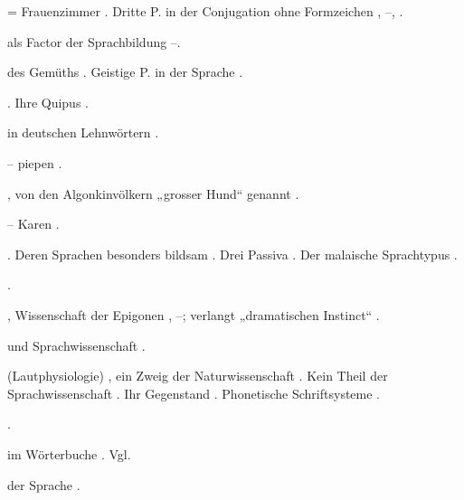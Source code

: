 \begin{register}

 = Frauenzimmer \pageref{sp.235}. Dritte P. in der Conjugation ohne Formzeichen \pageref{sp.383}, \pageref{sp.391}–\pageref{sp.392}, \pageref{sp.460}.

 als Factor der Sprachbildung \pageref{sp.315}–\pageref{sp.317}.

 des Gemüths \pageref{sp.307}. Geistige P. in der Sprache \pageref{sp.325}.

. Ihre Quipus \pageref{sp.128}.


 in deutschen Lehnwörtern \pageref{sp.186}.

 – piepen \pageref{sp.208}.

, von den Algonkinvölkern „grosser Hund“ genannt \pageref{sp.41}.

 – Karen \pageref{sp.201}.

 \pageref{sp.147}. Deren Sprachen besonders bildsam \pageref{sp.349}. Drei Passiva \pageref{sp.363}. Der malaische Sprachtypus \pageref{sp.415}.

 \pageref{sp.233}.

, Wissenschaft der Epigonen \pageref{sp.21}, \pageref{sp.24}–\pageref{sp.25}; verlangt „dramatischen Instinct“ \pageref{sp.52}.

 und Sprachwissenschaft \pageref{sp.14}.

 (Lautphysiologie) \sed{\pageref{sp.5}}, ein Zweig der Naturwissenschaft \pageref{sp.14}. Kein Theil der Sprachwissenschaft \pageref{sp.33}. Ihr Gegenstand \pageref{sp.33}. Phonetische Schriftsysteme \pageref{sp.38}. 

 \pageref{sp.130}.


 im Wörterbuche \pageref{sp.124}.  Vgl. 

 der Sprache \pageref{sp.17}. 



\end{register}
